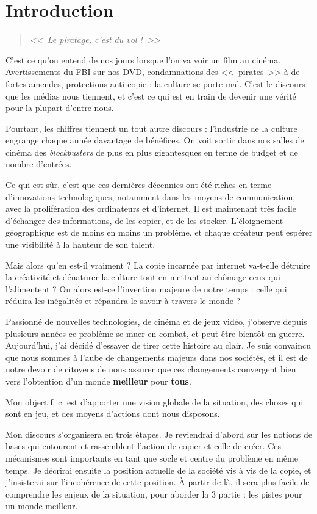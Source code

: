 \chapter*{Introduction}

\begin{quote}
{\Large \textit{<<~Le piratage, c'est du vol !~>>}}
\end{quote}

C'est ce qu'on entend de nos jours lorsque l'on va voir un film au cinéma.
Avertissements du FBI sur nos DVD, condamnations des <<~pirates~>> à de fortes amendes, protections anti-copie : la culture se porte mal.
C'est le discours que les médias nous tiennent, et c'est ce qui est en train de devenir une vérité pour la plupart d'entre nous.

Pourtant, les chiffres tiennent un tout autre discours : l'industrie de la culture engrange chaque année davantage de bénéfices.
On voit sortir dans nos salles de cinéma des \textit{blockbusters} de plus en plus gigantesques en terme de budget et de nombre d'entrées.

Ce qui est sûr, c'est que ces dernières décennies ont été riches en terme d'innovations technologiques, notamment dans les moyens de communication, avec la prolifération des ordinateurs et d'internet.
Il est maintenant très facile d'échanger des informations, de les copier, et de les stocker.
L'éloignement géographique est de moins en moins un problème, et chaque créateur peut espérer une visibilité à la hauteur de son talent.

Mais alors qu'en est-il vraiment ?
La copie incarnée par internet va-t-elle détruire la créativité et dénaturer la culture tout en mettant au chômage ceux qui l'alimentent ?
Ou alors est-ce l'invention majeure de notre temps : celle qui réduira les inégalités et répandra le savoir à travers le monde ?

Passionné de nouvelles technologies, de cinéma et de jeux vidéo, j'observe depuis plusieurs années ce problème se muer en combat, et peut-être bientôt en guerre.
Aujourd'hui, j'ai décidé d'essayer de tirer cette histoire au clair.
Je suis convaincu que nous sommes à l'aube de changements majeurs dans nos sociétés, et il est de notre devoir de citoyens de nous assurer que ces changements convergent bien vers l'obtention d'un monde \textbf{meilleur} pour \textbf{tous}.

Mon objectif ici est d'apporter une vision globale de la situation, des choses qui sont en jeu, et des moyens d'actions dont nous disposons.

Mon discours s'organisera en trois étapes.
Je reviendrai d'abord sur les notions de bases qui entourent et rassemblent l'action de copier et celle de créer.
Ces mécanismes sont importants en tant que socle et centre du problème en même temps.
Je décrirai ensuite la position actuelle de la société vis à vis de la copie, et j'insisterai sur l'incohérence de cette position.
À partir de là, il sera plus facile de comprendre les enjeux de la situation, pour aborder la 3\ieme{} partie : les pistes pour un monde meilleur.

